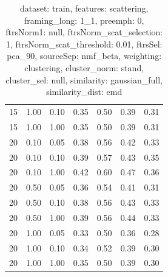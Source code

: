 \begin{table}
\begin{center}
\begin{tabular}{lllcccc}
15 & 1.00 & 0.10 & 0.35 & 0.50 & 0.39 & 0.31 \\ 
15 & 1.00 & 1.00 & 0.35 & 0.50 & 0.39 & 0.31 \\ 
20 & 0.10 & 0.05 & 0.38 & 0.56 & 0.42 & 0.33 \\ 
20 & 0.10 & 0.10 & 0.39 & 0.57 & 0.43 & 0.35 \\ 
20 & 0.10 & 1.00 & 0.42 & 0.60 & 0.47 & 0.36 \\ 
20 & 0.50 & 0.05 & 0.36 & 0.54 & 0.41 & 0.31 \\ 
20 & 0.50 & 0.10 & 0.38 & 0.56 & 0.43 & 0.33 \\ 
20 & 0.50 & 1.00 & 0.39 & 0.56 & 0.44 & 0.33 \\ 
20 & 1.00 & 0.05 & 0.33 & 0.50 & 0.36 & 0.28 \\ 
20 & 1.00 & 0.10 & 0.34 & 0.52 & 0.39 & 0.30 \\ 
20 & 1.00 & 1.00 & 0.35 & 0.50 & 0.39 & 0.30 \\ 
\end{tabular} 
\end{center} 
\caption{dataset: train, features: scattering, framing\_long: 1\_1, preemph: 0, ftrsNorm1: null, ftrsNorm\_scat\_selection: 1, ftrsNorm\_scat\_threshold: 0.01, ftrsSel: pca\_90, sourceSep: nmf\_beta, weighting: clustering, cluster\_norm: stand, cluster\_sel: null, similarity: gaussian\_full, similarity\_dist: emd} 
\label{datasetrFeaturscFraminlong1_1Preemp0Ftrsnorm1nuFtrsnoscatselect1Ftrsnoscatthresh0.01Ftrsselpc90SourcesepnmbeWeightclClustenormstClusteselnuSimilagafuSimiladistem} 
\end{table} 
 
